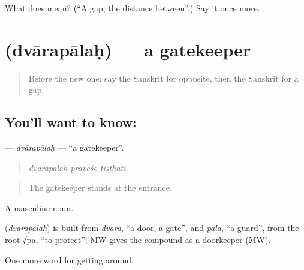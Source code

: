 \begin{tcolorbox}[breakable,colback=teal!4,colframe=teal!35!black,title={Before you move on}]
What does  mean? (\textquotedblleft{}A gap; the distance between\textquotedblright{}.) Say it once more.
\end{tcolorbox}
\section[\texorpdfstring{\sk{द्वारपालः} (dvārapālaḥ)}{द्वारपालः (dvārapālaḥ)}]{ (dvārapālaḥ) — a gatekeeper}

\label{lesson:SA-C423-dvarapalah}



\begin{quote}
Before the new one: say the Sanskrit for opposite, then the Sanskrit for a gap.
\end{quote}

\subsection*{You'll want to know: }
\textbf{} — \emph{dvārapālaḥ} — \textquotedblleft{}a gatekeeper\textquotedblright{}.

\begin{quote}
  
\end{quote}

\begin{quote}
\emph{dvārapālaḥ praveśe tiṣṭhati.}
\end{quote}

\begin{quote}
The gatekeeper stands at the entrance.
\end{quote}

A masculine noun.

\begin{cousinweb}
\textbf{} (\emph{dvārapālaḥ}) is built from \emph{dvāra}, \textquotedblleft{}a door, a gate\textquotedblright{}, and \emph{pāla}, \textquotedblleft{}a guard\textquotedblright{}, from the root √pā, \textquotedblleft{}to protect\textquotedblright{}; MW gives the compound as a doorkeeper (MW).
\end{cousinweb}

\begin{grammarlens}[title={What you've built}]
One more word for getting around.
\end{grammarlens}

